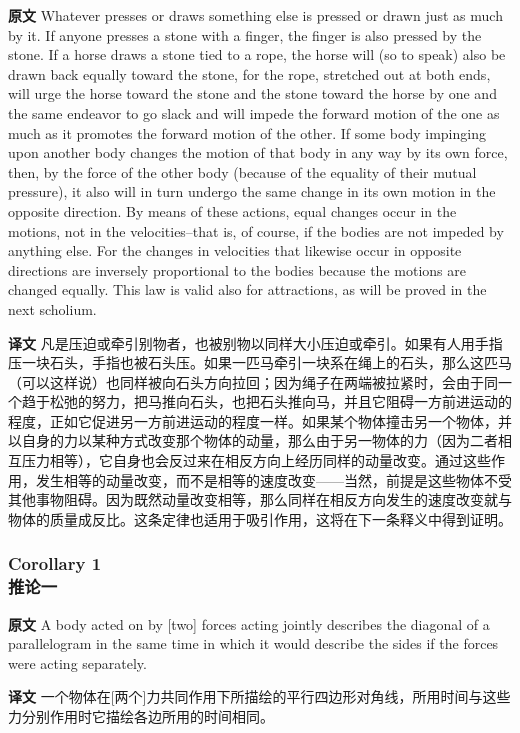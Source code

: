 \documentclass[UTF8,zihao=-4]{ctexart}
\begin{document}
\noindent\textbf{原文} Whatever presses or draws something else is pressed or drawn just as much by it. If anyone presses a stone with a finger, the finger is also pressed by the stone. If a horse draws a stone tied to a rope, the horse will (so to speak) also be drawn back equally toward the stone, for the rope, stretched out at both ends, will urge the horse toward the stone and the stone toward the horse by one and the same endeavor to go slack and will impede the forward motion of the one as much as it promotes the forward motion of the other. If some body impinging upon another body changes the motion of that body in any way by its own force, then, by the force of the other body (because of the equality of their mutual pressure), it also will in turn undergo the same change in its own motion in the opposite direction. By means of these actions, equal changes occur in the motions, not in the velocities--that is, of course, if the bodies are not impeded by anything else. For the changes in velocities that likewise occur in opposite directions are inversely proportional to the bodies because the motions are changed equally. This law is valid also for attractions, as will be proved in the next scholium.
\par\noindent\textbf{译文} 凡是压迫或牵引别物者，也被别物以同样大小压迫或牵引。如果有人用手指压一块石头，手指也被石头压。如果一匹马牵引一块系在绳上的石头，那么这匹马（可以这样说）也同样被向石头方向拉回；因为绳子在两端被拉紧时，会由于同一个趋于松弛的努力，把马推向石头，也把石头推向马，并且它阻碍一方前进运动的程度，正如它促进另一方前进运动的程度一样。如果某个物体撞击另一个物体，并以自身的力以某种方式改变那个物体的动量，那么由于另一物体的力（因为二者相互压力相等），它自身也会反过来在相反方向上经历同样的动量改变。通过这些作用，发生相等的动量改变，而不是相等的速度改变——当然，前提是这些物体不受其他事物阻碍。因为既然动量改变相等，那么同样在相反方向发生的速度改变就与物体的质量成反比。这条定律也适用于吸引作用，这将在下一条释义中得到证明。
\medskip

\subsubsection*{Corollary 1\\推论一}
\noindent\textbf{原文} A body acted on by [two] forces acting jointly describes the diagonal of a parallelogram in the same time in which it would describe the sides if the forces were acting separately.
\par\noindent\textbf{译文} 一个物体在[两个]力共同作用下所描绘的平行四边形对角线，所用时间与这些力分别作用时它描绘各边所用的时间相同。
\medskip
\end{document}
